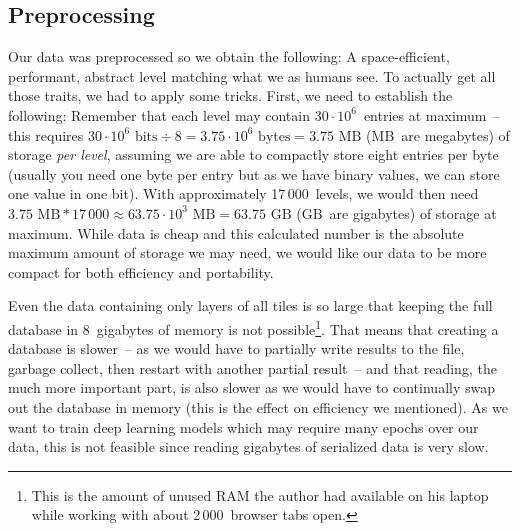 \subsection{Preprocessing}
\label{sec:preprocessing}

Our data was preprocessed so we obtain the following: A
space-efficient, performant, abstract level matching what we as humans
see. To actually get all those traits, we had to apply some tricks.
First, we need to establish the following: Remember that each level
may contain $30 \cdot 10^{6}$~entries at maximum~-- this requires
$30 \cdot 10^{6}\text{ bits} \div 8 = 3.75 \cdot 10^{6}\text{ bytes} =
3.75\text{ MB}$ (MB~are megabytes) of storage \emph{per level},
assuming we are able to compactly store eight entries per byte
(usually you need one byte per entry but as we have binary values, we
can store one value in one bit). With approximately 17\,000~levels, we
would then need
$3.75\text{ MB} * 17\,000 \approx 63.75 \cdot 10^{3}\text{ MB} =
63.75\text{ GB}$ (GB~are gigabytes) of storage at maximum. While data
is cheap and this calculated number is the absolute maximum amount of
storage we may need, we would like our data to be more compact for
both efficiency and portability.

Even the data containing only layers of all tiles is so large that
keeping the full database in 8~gigabytes of memory is not
possible\footnote{This is the amount of unused RAM the author had
  available on his laptop while working with about 2\,000~browser tabs
  open.}. That means that creating a database is slower~-- as we would
have to partially write results to the file, garbage collect, then
restart with another partial result~-- and that reading, the much more
important part, is also slower as we would have to continually swap
out the database in memory (this is the effect on efficiency we
mentioned). As we want to train deep learning models which may require
many epochs over our data, this is not feasible since reading
gigabytes of serialized data is very slow.

